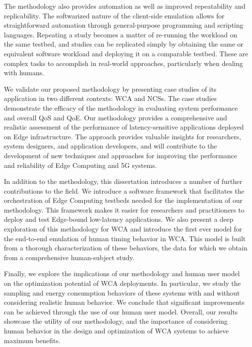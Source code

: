 The methodology also provides automation as well as improved repeatability and replicability.
The softwarized nature of the client-side emulation allows for straightforward automation through general-purpose programming and scripting languages.
Repeating a study becomes a matter of re-running the workload on the same testbed, and studies can be replicated simply by obtaining the same or equivalent software workload and deploying it on a comparable testbed.
These are complex tasks to accomplish in real-world approaches, particularly when dealing with humans.

We validate our proposed methodology by presenting case studies of its application in two different contexts: \gls{WCA} and \glspl{NCS}.
The case studies demonstrate the efficacy of the methodology in evaluating system performance and overall \gls{QoS} and \gls{QoE}.
Our methodology provides a comprehensive and realistic assessment of the performance of latency-sensitive applications deployed on Edge infrastructure.
The approach provides valuable insights for researchers, system designers, and application developers, and will contribute to the development of new techniques and approaches for improving the performance and reliability of Edge Computing and 5G systems.

In addition to the methodology, this dissertation introduces a number of further contributions to the field. 
We introduce a software framework that facilitates the orchestration of Edge Computing testbeds needed for the implementation of our methodology.
This framework makes it easier for researchers and practitioners to deploy and test Edge-bound low-latency applications.
We also present a deep exploration of this methodology for \gls{WCA} and introduce the first ever model for the end-to-end emulation of human timing behavior in \gls{WCA}.
This model is built from a thorough characterization of these behaviors, the data for which we obtain from a comprehensive human-subject study.

Finally, we explore the implications of our methodology and human user model on the optimization potential of \gls{WCA} deployments.
In particular, we study the sampling and energy consumption behaviors of these systems with and without considering realistic human behavior.
We conclude that significant improvements can be achieved through the use of our human user model.
Overall, our results showcase the utility of our methodology, and the importance of considering human behavior in the design and optimization of \gls{WCA} systems to achieve maximum benefits.

